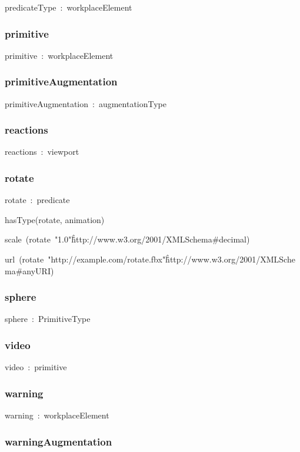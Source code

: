 \documentclass{article}
\begin{document}
predicateType~:~workplaceElement

\subsubsection*{primitive}

primitive~:~workplaceElement

\subsubsection*{primitiveAugmentation}

primitiveAugmentation~:~augmentationType

\subsubsection*{reactions}

reactions~:~viewport

\subsubsection*{rotate}

rotate~:~predicate

hasType(rotate, animation)

scale~(rotate~"1.0"\^\^http://www.w3.org/2001/XMLSchema#decimal)

url~(rotate~"http://example.com/rotate.fbx"\^\^http://www.w3.org/2001/XMLSchema#anyURI)

\subsubsection*{sphere}

sphere~:~PrimitiveType

\subsubsection*{video}

video~:~primitive

\subsubsection*{warning}

warning~:~workplaceElement

\subsubsection*{warningAugmentation}
\end{document}
